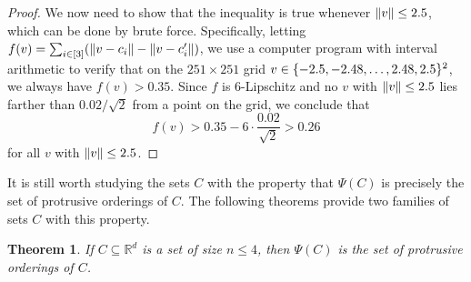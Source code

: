\documentclass[11pt]{amsart}
\newtheorem{theorem}{Theorem}[section]
\theoremstyle{definition}
\DeclarePairedDelimiter{\set}{\{}{\}}
\DeclarePairedDelimiter{\Abs}{\lVert}{\rVert}
\newcommand{\RR}{\mathbb{R}}
\begin{document}
\begin{proof}
We now need to show that the inequality is true whenever $\Abs{v} \leq 2.5$, which can be done by brute force. Specifically, letting $f(v) = \sum_{i \in [3]} (\Abs{v - c_i} - \Abs{v - c'_i})$, we use a computer program with interval arithmetic to verify that on the $251 \times 251$ grid $v \in \set{-2.5,-2.48,\ldots,2.48,2.5}^2$, we always have $f(v) > 0.35$. Since $f$ is $6$-Lipschitz and no $v$ with $\Abs{v}\leq 2.5$ lies farther than $0.02/\sqrt{2}$ from a point on the grid, we conclude that
\[f(v) > 0.35 - 6 \cdot \frac{0.02}{\sqrt{2}} > 0.26\]
for all $v$ with $\Abs{v} \leq 2.5$.
\end{proof}

It is still worth studying the sets $C$ with the property that $\Psi(C)$ is precisely the set of protrusive orderings of $C$. The following theorems provide two families of sets $C$ with this property. 

\begin{theorem}\label{thm:4-points}
If $C\subseteq\RR^d$ is a set of size $n\leq 4$, then $\Psi(C)$ is the set of protrusive orderings of $C$.
\end{theorem} 
\end{document}
